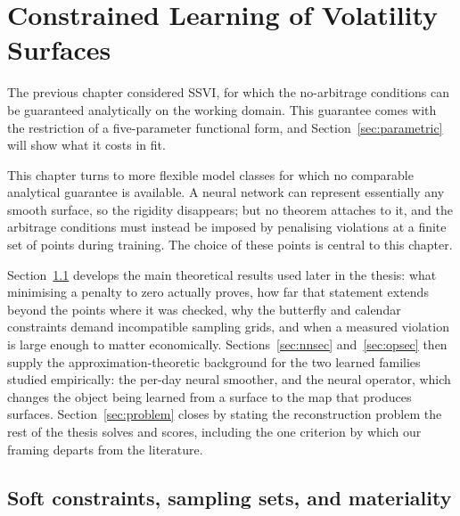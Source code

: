\chapter{Constrained Learning of Volatility Surfaces}\label{ch:learning}

The previous chapter considered SSVI, for which the no-arbitrage conditions can be guaranteed
analytically on the working domain. This guarantee comes with the restriction of a
five-parameter functional form, and Section~\ref{sec:parametric} will show what it costs in fit.

This chapter turns to more flexible model classes for which no comparable analytical guarantee is
available. A neural network can represent essentially any smooth surface, so the rigidity
disappears; but no theorem attaches to it, and the arbitrage conditions must instead be imposed
by penalising violations at a finite set of points during training. The choice of these points
is central to this chapter.

Section~\ref{sec:softtheory} develops the main theoretical results used later in the thesis:
what minimising a penalty to zero actually proves, how far that statement extends beyond the
points where it was checked, why the butterfly and calendar constraints demand incompatible
sampling grids, and when a measured violation is large enough to matter economically.
Sections~\ref{sec:nnsec} and~\ref{sec:opsec} then supply the approximation-theoretic background
for the two learned families studied empirically: the per-day neural smoother, and the neural
operator, which changes the object being learned from a surface to the map that produces
surfaces. Section~\ref{sec:problem} closes by stating the reconstruction problem the rest of the
thesis solves and scores, including the one criterion by which our framing departs from the
literature.

\section{Soft constraints, sampling sets, and materiality}\label{sec:softtheory}

